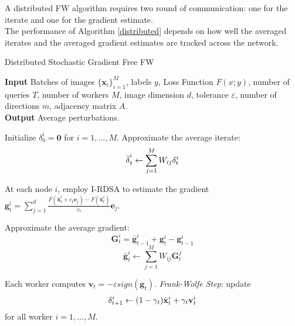 A distributed FW algorithm requires two round of communication: one for the iterate and one for the gradient estimate.\\
The performance of Algorithm \ref{distributed} depends on how well the averaged iterates and the averaged gradient estimates are tracked across the network.
\begin{algorithm}
	\caption{Distributed Stochastic Gradient Free FW}\label{distributed}
	\textbf{Input} Batches of images $\{\mathbf{x}_i\}_{i=1}^M$, labels $y$, Loss Function $F(x;y)$, number of queries $T$, number of workers $M$, image dimension $d$, tolerance $\varepsilon$, number of directions $m$, adjacency matrix $A$.\\
	\textbf{Output} Average perturbations.
	\begin{algorithmic}[1]		
		\State Initialize \boldmath$\delta_0^i = \mathbf{0}$ for $i=1,\dots, M$.
		\State Approximate the average iterate: \newline
		\[\bar{\text{\boldmath}\delta}_t^i \leftarrow \sum_{j=1}^{M} W_{ij}\text{\boldmath}\delta_t^i\]
		
		\State At each node $i$, employ I-RDSA to estimate the gradient 
		$\mathbf{g}_t^i = \sum_{j=1}^{d} \frac{F(\bar{\textbf{x}}_t^i + c_t\mathbf{e}_j) - F(\bar{\textbf{x}}_t^i)}{c_t}\mathbf{e}_j$.
		
		\State Approximate the average gradient:
		\[ \mathbf{G}_t^i = \bar{\mathbf{g}}_{t-1}^i + \mathbf{g}_t^i - \mathbf{g}_{t-1}^i \]
		\[ \bar{\mathbf{g}}_t^i \leftarrow \sum_{j=1}^{M} W_{ij}\mathbf{G}_t^j  \]
		
		\State Each worker computes $\mathbf{v}_t = - \varepsilon sign(\mathbf{g}_t)$.
		\State \textit{Frank-Wolfe Step}: update
		\[\text{\boldmath}\delta_{t+1}^i \leftarrow (1-\gamma_t)\bar{\mathbf{x}}_t^i + \gamma_t\mathbf{v}_t^i\]
		for all worker $i=1, \dots, M$.
		\EndFor
		
	\end{algorithmic}
\end{algorithm}
